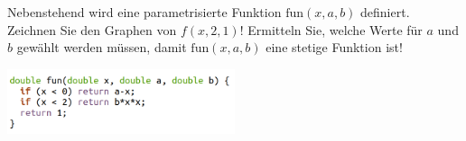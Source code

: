 \item 

\begin{multicols}{2}

Nebenstehend wird eine parametrisierte Funktion $\text{fun}(x,a,b)$ definiert. Zeichnen Sie den Graphen von $f(x,2,1)$! Ermitteln Sie, welche Werte für $a$ und $b$ gewählt werden müssen, damit $\text{fun}(x,a,b)$ eine stetige Funktion ist!

\columnbreak

\includegraphics[width=0.5\textwidth]{../tex-snippets/ex-graph-draw-3-img-a.png}

\end{multicols}


